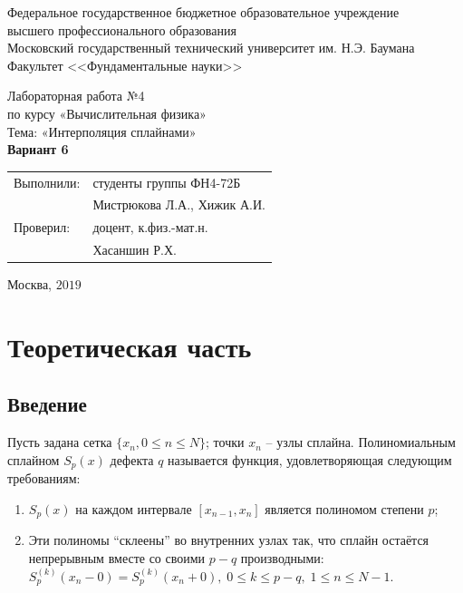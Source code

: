 \documentclass[
11pt,
master, %
subf, %
href, %
colorlinks=true, %
times, %
]{disser}
\begin{document}
	
\pagestyle{empty}
\begin{center}
	
	\noindent  Федеральное государственное бюджетное образовательное учреждение\\
	высшего профессионального образования\\
	
	Московский государственный технический университет им. Н.Э. Баумана \\
	Факультет <<Фундаментальные науки>>\bigskip\\
	
	\vfill
	
	Лабораторная работа №4\\
	по курсу «Вычислительная физика»\\
	Тема: «Интерполяция сплайнами»\\
	\textbf{Вариант 6}\\
	
	
	\vfill
	\vfill
	\begin{flushright}
		\begin{tabular}{ll}
			Выполнили: & студенты группы ФН4-72Б     \\
			& Мистрюкова Л.А., Хижик А.И.  \\
			Проверил:  & доцент, к.физ.-мат.н.       \\
			& Хасаншин Р.Х.
		\end{tabular}
	\end{flushright}
	\vfill
	\begin{center}
		Москва, $2019$
	\end{center}
	
\end{center}
\pagebreak


\pagestyle{plain}
\tableofcontents

\section{Теоретическая часть}
\subsection{Введение}
Пусть задана сетка $\{x_n, 0\leq n\leq N\}$; точки $x_n$ -- узлы сплайна. Полиномиальным сплайном $S_p(x)$ дефекта $q$ называется функция, удовлетворяющая следующим требованиям:
\begin{enumerate}
  \item $S_p(x)$ на каждом интервале $[x_{n-1}, x_n]$ является полиномом степени $p$;
  \item Эти полиномы ``склеены'' во внутренних узлах так, что сплайн остаётся непрерывным вместе со своими $p - q$ производными: $S_p^{(k)}(x_n-0) = S_p^{(k)}(x_n+0),\; 0\leq k\leq p-q,\;1\leq n\leq N-1$.
\end{enumerate}
\end{document}
